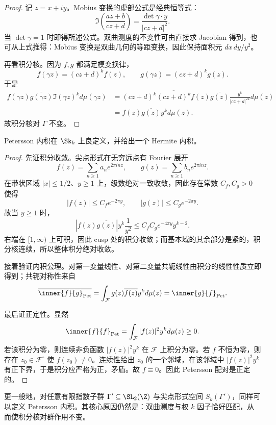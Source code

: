 \begin{proof}
记 $z=x+iy$。Mobius 变换的虚部公式是经典恒等式：
\[
\Im\!\left(\frac{az+b}{cz+d}\right)=\frac{\det\gamma\cdot y}{|cz+d|^2}.
\]
当 $\det\gamma=1$ 时即得所述公式。双曲测度的不变性可由直接求 Jacobian 得到，也可从上式推得：Mobius 变换是双曲几何的等距变换，因此保持面积元 $dx\,dy/y^2$。

再看积分核。因为 $f,g$ 都满足模变换律，
\[
f(\gamma z)=(cz+d)^k f(z),\qquad g(\gamma z)=(cz+d)^k g(z).
\]
于是
\begin{align*}
f(\gamma z)\overline{g(\gamma z)}\Im(\gamma z)^k d\mu(\gamma z)
&=(cz+d)^k\overline{(cz+d)^k}f(z)\overline{g(z)}\frac{y^k}{|cz+d|^{2k}}d\mu(z)\\
&=f(z)\overline{g(z)}y^k d\mu(z).
\end{align*}
故积分核对 $\Gamma$ 不变。
\end{proof}

\begin{theorem}
Petersson 内积在 $\Sk_k$ 上良定义，并给出一个 Hermite 内积。
\end{theorem}

\begin{proof}
先证积分收敛。尖点形式在无穷远点有 Fourier 展开
\[
f(z)=\sum_{n\ge 1} a_n e^{2\pi i nz},\qquad g(z)=\sum_{n\ge 1} b_n e^{2\pi i nz}.
\]
在带状区域 $|x|\le 1/2$、$y\ge 1$ 上，级数绝对一致收敛，因此存在常数 $C_f,C_g>0$ 使得
\[
|f(z)|\le C_f e^{-2\pi y},\qquad |g(z)|\le C_g e^{-2\pi y}.
\]
故当 $y\ge 1$ 时，
\[
|f(z)\overline{g(z)}|y^k\frac{1}{y^2}
\le C_fC_g e^{-4\pi y}y^{k-2}.
\]
右端在 $[1,\infty)$ 上可积，因此 cusp 处的积分收敛；而基本域的其余部分是紧的，积分核连续，所以整体积分绝对收敛。

接着验证内积公理。对第一变量线性、对第二变量共轭线性由积分的线性性质立即得到；共轭对称性来自
\[
\overline{\inner{f}{g}_{\mathrm{Pet}}}=\int_{\mathcal{F}} g(z)\overline{f(z)}y^k d\mu(z)=\inner{g}{f}_{\mathrm{Pet}}.
\]

最后证正定性。显然
\[
\inner{f}{f}_{\mathrm{Pet}}=\int_{\mathcal{F}} |f(z)|^2 y^k d\mu(z)\ge 0.
\]
若该积分为零，则连续非负函数 $|f(z)|^2 y^k$ 在 $\mathcal{F}$ 上积分为零。若 $f$ 不恒为零，则存在 $z_0\in\mathcal{F}^{\circ}$ 使 $f(z_0)\ne 0$。连续性给出 $z_0$ 的一个邻域，在该邻域中 $|f(z)|^2 y^k$ 有正下界，于是积分应严格为正，矛盾。故 $f\equiv 0$。因此 Petersson 配对是正定的。
\end{proof}

\begin{remark}
更一般地，对任意有限指数子群 $\Gamma'\subseteq \SL_2(\Z)$ 与尖点形式空间 $S_k(\Gamma')$，同样可以定义 Petersson 内积。其核心原因仍然是：双曲测度与权 $k$ 因子恰好匹配，从而使积分核对群作用不变。
\end{remark}

